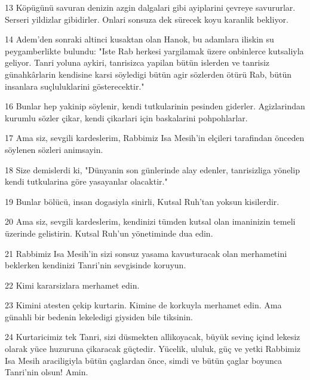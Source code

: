 \par 13 Köpügünü savuran denizin azgin dalgalari gibi ayiplarini çevreye savururlar. Serseri yildizlar gibidirler. Onlari sonsuza dek sürecek koyu karanlik bekliyor.
\par 14 Adem'den sonraki altinci kusaktan olan Hanok, bu adamlara iliskin su peygamberlikte bulundu: "Iste Rab herkesi yargilamak üzere onbinlerce kutsaliyla geliyor. Tanri yoluna aykiri, tanrisizca yapilan bütün islerden ve tanrisiz günahkârlarin kendisine karsi söyledigi bütün agir sözlerden ötürü Rab, bütün insanlara suçluluklarini gösterecektir."
\par 16 Bunlar hep yakinip söylenir, kendi tutkularinin pesinden giderler. Agizlarindan kurumlu sözler çikar, kendi çikarlari için baskalarini pohpohlarlar.
\par 17 Ama siz, sevgili kardeslerim, Rabbimiz Isa Mesih'in elçileri tarafindan önceden söylenen sözleri animsayin.
\par 18 Size demislerdi ki, "Dünyanin son günlerinde alay edenler, tanrisizliga yönelip kendi tutkularina göre yasayanlar olacaktir."
\par 19 Bunlar bölücü, insan dogasiyla sinirli, Kutsal Ruh'tan yoksun kisilerdir.
\par 20 Ama siz, sevgili kardeslerim, kendinizi tümden kutsal olan imaninizin temeli üzerinde gelistirin. Kutsal Ruh'un yönetiminde dua edin.
\par 21 Rabbimiz Isa Mesih'in sizi sonsuz yasama kavusturacak olan merhametini beklerken kendinizi Tanri'nin sevgisinde koruyun.
\par 22 Kimi kararsizlara merhamet edin.
\par 23 Kimini atesten çekip kurtarin. Kimine de korkuyla merhamet edin. Ama günahli bir bedenin lekeledigi giysiden bile tiksinin.
\par 24 Kurtaricimiz tek Tanri, sizi düsmekten allikoyacak, büyük sevinç içind lekesiz olarak yüce huzuruna çikaracak güçtedir. Yücelik, ululuk, güç ve yetki Rabbimiz Isa Mesih araciligiyla bütün çaglardan önce, simdi ve bütün çaglar boyunca Tanri'nin olsun! Amin.


